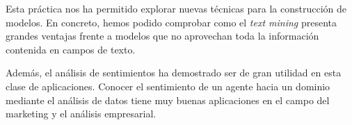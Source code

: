 \documentclass[12pt]{report} %
\begin{document}
Esta práctica nos ha permitido explorar nuevas técnicas para la construcción de modelos. En concreto, hemos podido comprobar como el \textit{text mining} presenta grandes ventajas frente a modelos que no aprovechan toda la información contenida en campos de texto.

Además, el análisis de sentimientos ha demostrado ser de gran utilidad en esta clase de aplicaciones. Conocer el sentimiento de un agente hacia un dominio mediante el análisis de datos tiene muy buenas aplicaciones en el campo del marketing y el análisis empresarial.


\clearpage

{}
\label{chap:bibliography}
\printbibliography




\end{document}
